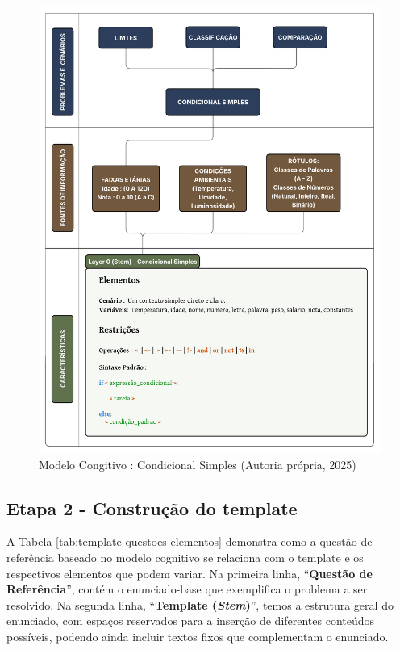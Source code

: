 \begin{figure}[ht]
	\centering
	\includegraphics[width=16cm]{./imagens/capitulo4/modelo-cognitivo-1-layer}
	\caption{Modelo Congitivo : Condicional Simples  (Autoria própria, 2025)}
	\label{fig:condicional-simples}
\end{figure}
\subsection{Etapa 2 - Construção do template} 

A Tabela \ref{tab:template-questoes-elementos} demonstra como a questão de referência baseado no modelo cognitivo se relaciona com o template e os respectivos elementos que podem variar. Na primeira linha, “\textbf{Questão de Referência}”, contém o enunciado-base que exemplifica o problema a ser resolvido. Na segunda linha, “\textbf{Template (\textit{Stem})}”, temos a estrutura geral do enunciado, com espaços reservados para a inserção de diferentes conteúdos possíveis, podendo ainda incluir textos fixos que complementam o enunciado.

